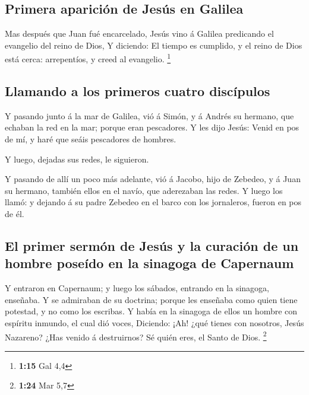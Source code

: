 \hypertarget{primera-apariciuxf3n-de-jesuxfas-en-galilea}{%
\subsection{Primera aparición de Jesús en
Galilea}\label{primera-apariciuxf3n-de-jesuxfas-en-galilea}}

 Mas después que Juan fué encarcelado, Jesús vino á
Galilea predicando el evangelio del reino de Dios,  Y
diciendo: El tiempo es cumplido, y el reino de Dios está cerca:
arrepentíos, y creed al evangelio. \footnote{\textbf{1:15} Gal 4,4}

\hypertarget{llamando-a-los-primeros-cuatro-discuxedpulos}{%
\subsection{Llamando a los primeros cuatro
discípulos}\label{llamando-a-los-primeros-cuatro-discuxedpulos}}

 Y pasando junto á la mar de Galilea, vió á Simón, y á
Andrés su hermano, que echaban la red en la mar; porque eran pescadores.
 Y les dijo Jesús: Venid en pos de mí, y haré que seáis
pescadores de hombres.

 Y luego, dejadas sus redes, le siguieron.

 Y pasando de allí un poco más adelante, vió á Jacobo,
hijo de Zebedeo, y á Juan su hermano, también ellos en el navío, que
aderezaban las redes.  Y luego los llamó: y dejando á su
padre Zebedeo en el barco con los jornaleros, fueron en pos de él.

\hypertarget{el-primer-sermuxf3n-de-jesuxfas-y-la-curaciuxf3n-de-un-hombre-poseuxeddo-en-la-sinagoga-de-capernaum}{%
\subsection{El primer sermón de Jesús y la curación de un hombre poseído
en la sinagoga de
Capernaum}\label{el-primer-sermuxf3n-de-jesuxfas-y-la-curaciuxf3n-de-un-hombre-poseuxeddo-en-la-sinagoga-de-capernaum}}

 Y entraron en Capernaum; y luego los sábados, entrando
en la sinagoga, enseñaba.  Y se admiraban de su doctrina;
porque les enseñaba como quien tiene potestad, y no como los escribas.
 Y había en la sinagoga de ellos un hombre con espíritu
inmundo, el cual dió voces,  Diciendo: ¡Ah! ¿qué tienes
con nosotros, Jesús Nazareno? ¿Has venido á destruirnos? Sé quién eres,
el Santo de Dios. \footnote{\textbf{1:24} Mar 5,7}

